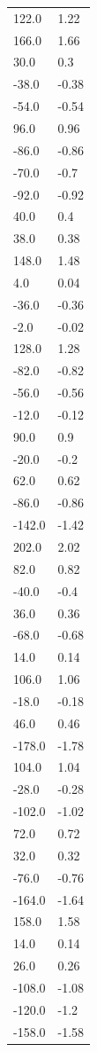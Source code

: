 \begin{longtable}{ll}
122.0 & 1.22 \\
166.0 & 1.66 \\
30.0 & 0.3 \\
-38.0 & -0.38 \\
-54.0 & -0.54 \\
96.0 & 0.96 \\
-86.0 & -0.86 \\
-70.0 & -0.7 \\
-92.0 & -0.92 \\
40.0 & 0.4 \\
38.0 & 0.38 \\
148.0 & 1.48 \\
4.0 & 0.04 \\
-36.0 & -0.36 \\
-2.0 & -0.02 \\
128.0 & 1.28 \\
-82.0 & -0.82 \\
-56.0 & -0.56 \\
-12.0 & -0.12 \\
90.0 & 0.9 \\
-20.0 & -0.2 \\
62.0 & 0.62 \\
-86.0 & -0.86 \\
-142.0 & -1.42 \\
202.0 & 2.02 \\
82.0 & 0.82 \\
-40.0 & -0.4 \\
36.0 & 0.36 \\
-68.0 & -0.68 \\
14.0 & 0.14 \\
106.0 & 1.06 \\
-18.0 & -0.18 \\
46.0 & 0.46 \\
-178.0 & -1.78 \\
104.0 & 1.04 \\
-28.0 & -0.28 \\
-102.0 & -1.02 \\
72.0 & 0.72 \\
32.0 & 0.32 \\
-76.0 & -0.76 \\
-164.0 & -1.64 \\
158.0 & 1.58 \\
14.0 & 0.14 \\
26.0 & 0.26 \\
-108.0 & -1.08 \\
-120.0 & -1.2 \\
-158.0 & -1.58 \\

\end{longtable}
